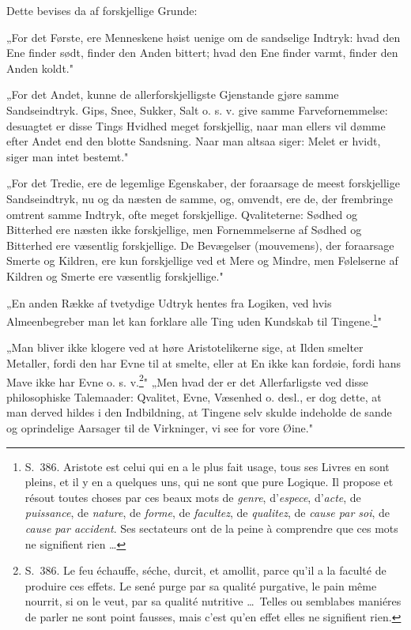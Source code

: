 \documentclass[12pt,a4paper]{article}
\newcommand{\opage}[1]{\marginnote{\footnotesize\textit{[#1]}}}
\begin{document}
Dette bevises da af forskjellige Grunde:

„For det Første, ere Menneskene høist uenige om de sandselige Indtryk: hvad den
Ene finder sødt, finder den Anden bittert; hvad den Ene finder varmt, finder den
Anden koldt."

„For det Andet, kunne de allerforskjelligste Gjenstande gjøre samme
Sandseindtryk. Gips, Snee, Sukker, Salt o. s. v. give samme Farvefornemmelse:
desuagtet er disse Tings Hvidhed meget forskjellig, naar man ellers vil dømme
efter Andet end den blotte Sandsning. Naar man altsaa siger: Melet er hvidt,
siger man intet bestemt."

„For det Tredie, ere de legemlige Egenskaber, der foraarsage de meest
forskjellige Sandseindtryk, nu og da næsten de samme, og, omvendt, ere de, der
frembringe omtrent samme Indtryk, ofte meget forskjellige. Qvaliteterne: Sødhed
og Bitterhed ere næsten ikke forskjellige, men Fornemmelserne af Sødhed og
Bitterhed ere væsentlig forskjellige. De Bevægelser (mouvemens), der foraarsage
Smerte og Kildren, ere kun forskjellige ved et Mere og Mindre, men Følelserne af
Kildren og Smerte ere væsentlig forskjellige."

„En anden Række af tvetydige Udtryk hentes fra Logiken, ved hvis Almeenbegreber
man let kan forklare alle Ting uden Kundskab til
Tingene.\footnote{S.~386. Aristote est celui qui en a le plus fait usage, tous
ses Livres en sont pleins, et il y en a quelques uns, qui ne sont que pure
Logique. Il propose et résout toutes choses par ces beaux mots de \emph{genre},
d'\emph{espece}, d'\emph{acte}, de \emph{puissance}, de \emph{nature}, de
\emph{forme}, de \emph{facultez}, de \emph{qualitez}, de \emph{cause par soi}, de
\emph{cause par accident}. Ses sectateurs ont de la peine à comprendre que ces
mots ne signifient rien \dots}"

„Man bliver ikke klogere ved at høre Aristotelikerne sige, at Ilden smelter
Metaller, fordi den har Evne til at smelte, eller at En ikke kan fordøie, fordi
hans Mave ikke har Evne o. s. v.\footnote{S.~386. Le feu échauffe, séche, durcit,
et amollit, parce qu'il a la faculté de produire ces effets. Le sené purge par sa
qualité purgative, le pain même nourrit, si on le veut, par sa qualité nutritive
\dots\ Telles ou semblabes maniéres de parler ne sont point fausses, mais c'est
qu'en effet elles ne signifient rien.}"
\opage{19} „Men hvad der er det Allerfarligste ved disse philosophiske Talemaader:
Qvalitet, Evne, Væsenhed o. desl., er dog dette, at man derved hildes i den
Indbildning, at Tingene selv skulde indeholde de sande og oprindelige Aarsager
til de Virkninger, vi see for vore Øine."
\end{document}

